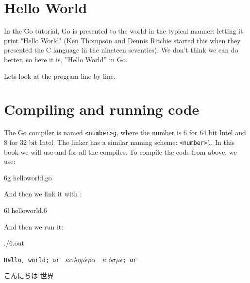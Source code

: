 \section{Hello World}
\label{sec:hello world}
In the Go tutorial, Go is presented to the world in the typical
manner: letting it print "Hello World" (Ken Thompson and
Dennis Ritchie started this when they presented the C language in 
the nineteen seventies). We don't think we can do better, so 
here it is, ''Hello World'' in Go.


Lets look at the program line by line.
\showremarks

\section{Compiling and running code}
The Go compiler is named \verb|<number>g|, where the number is 6 for 64 bit
Intel and 8 for 32 bit Intel. The linker has a similar naming scheme:
\verb|<number>l|. In this book we will use  and  for
all the compiles. To compile the code from above, we use:
\begin{display}
\pr 6g helloworld.go
\end{display}
And then we link it with :
\begin{display}
\pr 6l helloworld.6
\end{display}

And then we run it:
\begin{display}
\pr ./6.out	    
\end{display}
\vspace{-3.0ex}
\texttt{Hello, world; or }%
\begin{math}\kappa\alpha\lambda\eta\mu\acute{\epsilon}\rho\alpha\hspace{1em}\kappa\end{math}%
\'o\begin{math} \sigma\mu\epsilon\end{math}\texttt{; or }\begin{cjk}こんにちは 世界\end{cjk}
\ \newline
\ \newline

